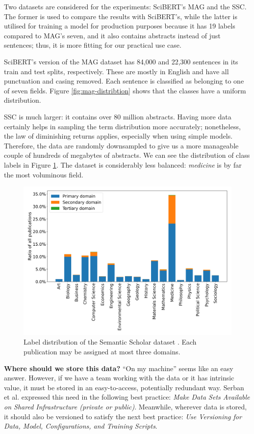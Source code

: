 Two datasets are considered for the experiments: SciBERT's MAG and the SSC. The former is used to compare the results with SciBERT's, while the latter is utilised for training a model for production purposes because it has 19 labels compared to MAG's seven, and it also contains abstracts instead of just sentences; thus, it is more fitting for our practical use case.

SciBERT's version of the MAG dataset has 84,000 and 22,300 sentences in its train and test splits, respectively. These are mostly in English and have all punctuation and casing removed. Each sentence is classified as belonging to one of seven fields. Figure \ref{fig:mag-distribtion} shows that the classes have a uniform distribution. 

SSC is much larger: it contains over 80 million abstracts. Having more data certainly helps in sampling the term distribution more accurately; nonetheless, the law of diminishing returns applies, especially when using simple models. Therefore, the data are randomly downsampled to give us a more manageable couple of hundreds of megabytes of abstracts. We can see the distribution of class labels in Figure \ref{fig:ss-distribution}. The dataset is considerably less balanced: \textit{medicine} is by far the most voluminous field.

\begin{figure}
    \centering
    \includegraphics[width=0.85\linewidth]{figures/ss-distribution.png}
    \captionsetup{width=.9\linewidth}
    \caption{Label distribution of the Semantic Scholar dataset \cite{Lo2020S2ORCTS}. Each publication may be assigned at most three domains.}
    \label{fig:ss-distribution}
\end{figure}

\begin{displayquote}
\textbf{Where should we store this data?} ``On my machine'' seems like an easy answer. However, if we have a team working with the data or it has intrinsic value, it must be stored in an easy-to-access, potentially redundant way. Serban et al. \cite{serban2020adoption} expressed this need in the following best practice: \textit{Make Data Sets Available on Shared Infrastructure (private or public)}. Meanwhile, wherever data is stored, it should also be versioned to satisfy the next best practice: \textit{Use Versioning for Data, Model, Configurations, and Training Scripts}.
\end{displayquote}

